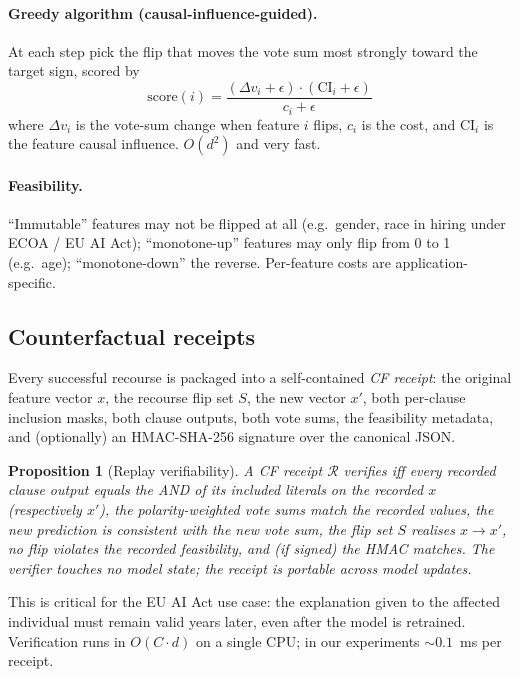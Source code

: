 \documentclass[11pt]{article}
\newtheorem{proposition}{Proposition}
\begin{document}
\paragraph{Greedy algorithm (causal-influence-guided).}  At each step pick the flip that moves the vote sum most strongly toward the target sign, scored by
\[
\mathrm{score}(i) = \frac{(\Delta v_i + \epsilon) \cdot (\mathrm{CI}_i + \epsilon)}{c_i + \epsilon}
\]
where $\Delta v_i$ is the vote-sum change when feature $i$ flips, $c_i$ is the cost, and $\mathrm{CI}_i$ is the feature causal influence.  $O(d^2)$ and very fast.

\paragraph{Feasibility.}  ``Immutable'' features may not be flipped at all (e.g.\ gender, race in hiring under ECOA / EU AI Act); ``monotone-up'' features may only flip from 0 to 1 (e.g.\ age); ``monotone-down'' the reverse.  Per-feature costs are application-specific.

\subsection{Counterfactual receipts}

Every successful recourse is packaged into a self-contained \emph{CF receipt}: the original feature vector $x$, the recourse flip set $S$, the new vector $x'$, both per-clause inclusion masks, both clause outputs, both vote sums, the feasibility metadata, and (optionally) an HMAC-SHA-256 signature over the canonical JSON.

\begin{proposition}[Replay verifiability]
\label{prop:replay}
A CF receipt $\mathcal{R}$ verifies iff every recorded clause output equals the AND of its included literals on the recorded $x$ (respectively $x'$), the polarity-weighted vote sums match the recorded values, the new prediction is consistent with the new vote sum, the flip set $S$ realises $x \to x'$, no flip violates the recorded feasibility, and (if signed) the HMAC matches.  The verifier touches no model state; the receipt is portable across model updates.
\end{proposition}

This is critical for the EU AI Act use case: the explanation given to the affected individual must remain valid years later, even after the model is retrained.  Verification runs in $O(C \cdot d)$ on a single CPU; in our experiments $\sim$$0.1$~ms per receipt.
\end{document}
